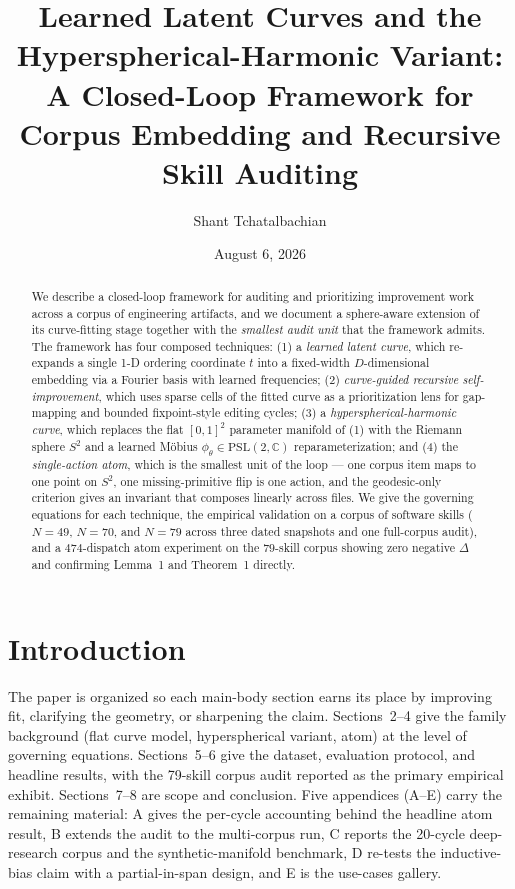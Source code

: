 \documentclass[11pt,a4paper]{article}
\title{Learned Latent Curves and the Hyperspherical-Harmonic Variant:\\
  {\large A Closed-Loop Framework for Corpus Embedding and Recursive Skill Auditing}}
\author{Shant Tchatalbachian}
\date{August 6, 2026}
\theoremstyle{plain}
\theoremstyle{remark}
\theoremstyle{plain}
\begin{document}
\maketitle

\begin{abstract}
We describe a closed-loop framework for auditing and prioritizing improvement work across a corpus of engineering artifacts, and we document a sphere-aware extension of its curve-fitting stage together with the \emph{smallest audit unit} that the framework admits. The framework has four composed techniques: (1) a \emph{learned latent curve}, which re-expands a single 1-D ordering coordinate $t$ into a fixed-width $D$-dimensional embedding via a Fourier basis with learned frequencies; (2) \emph{curve-guided recursive self-improvement}, which uses sparse cells of the fitted curve as a prioritization lens for gap-mapping and bounded fixpoint-style editing cycles; (3) a \emph{hyperspherical-harmonic curve}, which replaces the flat $[0,1]^2$ parameter manifold of (1) with the Riemann sphere $S^2$ and a learned M\"obius $\phi_\theta \in \mathrm{PSL}(2,\mathbb{C})$ reparameterization; and (4) the \emph{single-action atom}, which is the smallest unit of the loop --- one corpus item maps to one point on $S^2$, one missing-primitive flip is one action, and the geodesic-only criterion gives an invariant that composes linearly across files. We give the governing equations for each technique, the empirical validation on a corpus of software skills ($N = 49$, $N = 70$, and $N = 79$ across three dated snapshots and one full-corpus audit), and a $474$-dispatch atom experiment on the $79$-skill corpus showing zero negative $\Delta$ and confirming Lemma~1 and Theorem~1 directly.
\end{abstract}

\section{Introduction}

The paper is organized so each main-body section earns its place by improving fit, clarifying the geometry, or sharpening the claim. Sections~2--4 give the family background (flat curve model, hyperspherical variant, atom) at the level of governing equations. Sections~5--6 give the dataset, evaluation protocol, and headline results, with the 79-skill corpus audit reported as the primary empirical exhibit. Sections~7--8 are scope and conclusion. Five appendices (A--E) carry the remaining material: A gives the per-cycle accounting behind the headline atom result, B extends the audit to the multi-corpus run, C reports the 20-cycle deep-research corpus and the synthetic-manifold benchmark, D re-tests the inductive-bias claim with a partial-in-span design, and E is the use-cases gallery.
\end{document}
